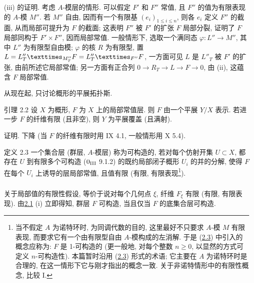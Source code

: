 (iii) 的证明. 考虑 $A$-模层的情形.
可以假定 $F'$ 和 $F''$ 常值, 且 $F''$ 的值为有限表现的 $A$-模 $M''$.
若 $M''$ 自由, 因而有一个有限基 $(e_i)_{1\leq i\leq n}$,
则各 $e_i$ 定义 $F''$ 的截面, 从而局部可提升为 $F$ 的截面;
这表明 $F''$ 被 $F'$ 的扩张 $F$ 局部分裂,
证明了 $F$ 局部同构于 $F'\times F''$, 因而局部常值.
一般情形下, 选取一个满同态 $\varphi:L''\rightarrow M''$,
其中 $L''$ 为有限型自由模;
$\varphi$ 的核 $R$ 为有限型, 置
$L=\fprod{L''_T}{F}{M''_T}=\fprod{L''_T}{F}{F''}$,
一方面可见 $L$ 是 $L''_T$ 被 $F'$ 的扩张,
由前所述它局部常值;
另一方面有正合列 $0\rightarrow R_T\rightarrow L\rightarrow
F\rightarrow 0$, 由 (ii), 这蕴含 $F$ 局部常值.

从现在起, 只讨论概形的平展拓扑斯.

\begin{enonce*}{引理 2.2}
设 $X$ 为概形, $F$ 为 $X$ 上的局部常值层.
则 $F$ 由一个平展 $Y/X$ 表示.
若进一步 $F$ 的纤维有限 (\resp 且非空),
则 $Y$ 为平展覆盖 (\resp 且满射).
\end{enonce*}

证明. 下降 (当 $F$ 的纤维有限时用  IX 4.1,
一般情形用  X 5.4).

\begin{enonce*}{定义 2.3}
一个集合层 (\resp 群层, \resp $A$-模层) 称为可构造的,
若对每个仿射开集 $U\subset X$, 都存在 $U$ 到有限多个可构造
{\rm (\EGA $0_{{\rm III}}$ 9.1.2)} 的既约局部闭子概形 $U_i$ 的并的分解,
使得 $F$ 在每个 $U_i$ 上\pageoriginale 诱导的层局部常值,
且值有限 (\resp 有限, \resp 有限表现\footnote[1]{当不假定 $A$ 为诺特环时,
为同调代数的目的, 这里最好不只要求 $A$-模 $M$ 有限表现,
而要求它有一个由有限型自由 $A$-模构成的左消解.
于是 (\hyperref[IX.def2.3]{2.3}) 中引入的概念应称为:
$F$ 是 1-可构造的 (更一般地, 对每个整数 $n\geq 0$,
以显然的方式可定义 $n$-可构造性).
本篇暂时沿用 (\hyperref[IX.def2.3]{2.3}) 形式的术语;
它主要在 $A$ 为诺特环时是合理的, 在这一情形下它与刚才指出的概念一致.
关于非诺特情形中的有限性概念, 比较  I.}).
\end{enonce*}

\setcounter{subsection}{3}
\subsubsection{}
关于局部值的有限性假设, 等价于说对每个几何点 $\xi$,
纤维 $F_{\xi}$ 有限 (\resp 有限, \resp 有限表现).
由\hyperref[IX.lem2.1]{2.1} (i) 立即得知,
群层 $F$ 可构造, 当且仅当 $F$ 的底集合层可构造.

